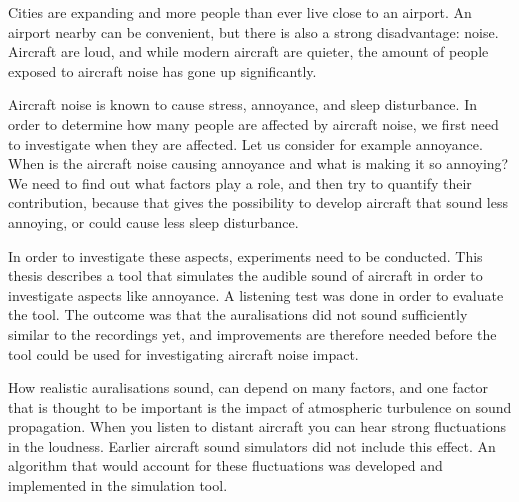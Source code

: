Cities are expanding and more people than ever live close to an airport. An
airport nearby can be convenient, but there is also a strong disadvantage:
noise. Aircraft are loud, and while modern aircraft are quieter, the amount of
people exposed to aircraft noise has gone up significantly.

Aircraft noise is known to cause stress, annoyance, and sleep disturbance. In
order to determine how many people are affected by aircraft noise, we first need
to investigate when they are affected. Let us consider for example annoyance.
When is the aircraft noise causing annoyance and what is making it so annoying?
We need to find out what factors play a role, and then try to quantify their
contribution, because that gives the possibility to develop aircraft that sound
less annoying, or could cause less sleep disturbance.

In order to investigate these aspects, experiments need to be conducted. This
thesis describes a tool that simulates the audible sound of aircraft in order to
investigate aspects like annoyance. A listening test was done in order to
evaluate the tool. The outcome was that the auralisations did not sound
sufficiently similar to the recordings yet, and improvements are therefore
needed before the tool could be used for investigating aircraft noise impact.

How realistic auralisations sound, can depend on many factors, and one factor that is
thought to be important is the impact of atmospheric turbulence on sound
propagation. When you listen to distant aircraft you can hear strong
fluctuations in the loudness. Earlier aircraft sound simulators did not include
this effect. An algorithm that would account for these fluctuations was
developed and implemented in the simulation tool.
